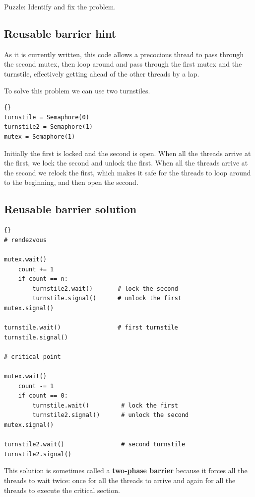 \documentclass{book}
\newcommand{\clearemptydoublepage}{\newpage\cleardoublepage}
\begin{document}
Puzzle: Identify and fix the problem.


\clearemptydoublepage
\subsection {Reusable barrier hint}

As it is currently written, this code
allows a precocious thread to pass through the second mutex,
then loop around and pass through the first mutex and the
turnstile, effectively getting ahead of the other threads by
a lap.

To solve this problem we can use two turnstiles.

\begin{lstlisting}[title={Reusable barrier hint}]{}
turnstile = Semaphore(0)
turnstile2 = Semaphore(1)
mutex = Semaphore(1)
\end{lstlisting}

Initially the first is locked and the second is open.  When all the
threads arrive at the first, we lock the second and unlock the first.
When all the threads arrive at the second we relock the first,
which makes it safe for the threads to loop around to the beginning,
and then open the second.



\clearemptydoublepage
\subsection {Reusable barrier solution}

\begin{lstlisting}[title={Reusable barrier solution}]{}
# rendezvous

mutex.wait()
    count += 1
    if count == n:
        turnstile2.wait()       # lock the second
        turnstile.signal()      # unlock the first
mutex.signal()

turnstile.wait()                # first turnstile
turnstile.signal()

# critical point

mutex.wait()
    count -= 1
    if count == 0: 
        turnstile.wait()         # lock the first
        turnstile2.signal()      # unlock the second
mutex.signal()

turnstile2.wait()                # second turnstile
turnstile2.signal()
\end{lstlisting}

This solution is sometimes called a {\bf two-phase barrier} because
it forces all the threads to wait twice: once for all the threads
to arrive and again for all the threads to execute the critical
section.
\end{document}
